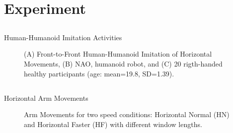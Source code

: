 
\section{Experiment}

\subsection{}
{

\begin{frame}{Human-Humanoid Imitation Activities}
    \begin{figure}
	\caption[PA]{(A) Front-to-Front Human-Humanoid Imitation 
		of Horizontal Movements,
		(B) NAO, humanoid robot, and
		(C) 20 rigth-handed healthy participants (age: mean=19.8, SD=1.39).
		}
   \end{figure}
	
\end{frame}
}

\subsection{}
{

\begin{frame}{Horizontal Arm Movements}
    \begin{figure}
	\caption[PA]{
		Arm Movements for two speed conditions:
		 Horizontal Normal (HN) and Horizontal Faster (HF) 
		with different window lengths.
		}
   \end{figure}
	
\end{frame}
}





